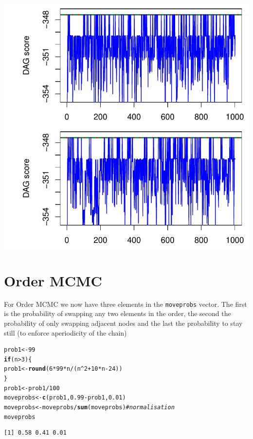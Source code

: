 \documentclass[a4paper]{article}\usepackage[]{graphicx}\usepackage[]{color}
\makeatletter
\def\maxwidth{ %
  \ifdim\Gin@nat@width>\linewidth
    \linewidth
  \else
    \Gin@nat@width
  \fi
}
\newcommand{\hlnum}[1]{\textcolor[rgb]{0.686,0.059,0.569}{#1}}%
\newcommand{\hlcom}[1]{\textcolor[rgb]{0.678,0.584,0.686}{\textit{#1}}}%
\newcommand{\hlopt}[1]{\textcolor[rgb]{0,0,0}{#1}}%
\newcommand{\hlstd}[1]{\textcolor[rgb]{0.345,0.345,0.345}{#1}}%
\newcommand{\hlkwa}[1]{\textcolor[rgb]{0.161,0.373,0.58}{\textbf{#1}}}%
\newcommand{\hlkwb}[1]{\textcolor[rgb]{0.69,0.353,0.396}{#1}}%
\newcommand{\hlkwd}[1]{\textcolor[rgb]{0.737,0.353,0.396}{\textbf{#1}}}%
\newenvironment{kframe}{%
 \def\at@end@of@kframe{}%
 \ifinner\ifhmode%
  \def\at@end@of@kframe{\end{minipage}}%
  \begin{minipage}{\columnwidth}%
 \fi\fi%
 \def\FrameCommand##1{\hskip\@totalleftmargin \hskip-\fboxsep
 \colorbox{shadecolor}{##1}\hskip-\fboxsep
     \hskip-\linewidth \hskip-\@totalleftmargin \hskip\columnwidth}%
 \MakeFramed {\advance\hsize-\width
   \@totalleftmargin\z@ \linewidth\hsize
   \@setminipage}}%
 {\par\unskip\endMakeFramed%
 \at@end@of@kframe}
\newenvironment{knitrout}{}{} %
\newcommand{\nn}{\noindent}
\makeatother
\begin{document}
\begin{knitrout}
{\centering \includegraphics[width=\maxwidth]{figure/minimal-unnamed-chunk-18-1} 

}



\end{knitrout}

\section{Order MCMC}

\nn For Order MCMC we now have three elements in the \texttt{moveprobs} vector.  The first is the probability of swapping any two elements in the order, the second the probability of only swapping adjacent nodes and the last the probability to stay still (to enforce aperiodicity of the chain)

\begin{knitrout}
\color{fgcolor}\begin{kframe}
\begin{alltt}
\hlstd{prob1} \hlkwb{<-} \hlnum{99}
\hlkwa{if} \hlstd{(n} \hlopt{>} \hlnum{3}\hlstd{) \{}
    \hlstd{prob1} \hlkwb{<-} \hlkwd{round}\hlstd{(}\hlnum{6} \hlopt{*} \hlnum{99} \hlopt{*} \hlstd{n}\hlopt{/}\hlstd{(n}\hlopt{^}\hlnum{2} \hlopt{+} \hlnum{10} \hlopt{*} \hlstd{n} \hlopt{-} \hlnum{24}\hlstd{))}
\hlstd{\}}
\hlstd{prob1} \hlkwb{<-} \hlstd{prob1}\hlopt{/}\hlnum{100}
\hlstd{moveprobs} \hlkwb{<-} \hlkwd{c}\hlstd{(prob1,} \hlnum{0.99} \hlopt{-} \hlstd{prob1,} \hlnum{0.01}\hlstd{)}
\hlstd{moveprobs} \hlkwb{<-} \hlstd{moveprobs}\hlopt{/}\hlkwd{sum}\hlstd{(moveprobs)}  \hlcom{# normalisation}
\hlstd{moveprobs}
\end{alltt}
\begin{verbatim}
[1] 0.58 0.41 0.01
\end{verbatim}
\end{kframe}
\end{knitrout}
\end{document}
